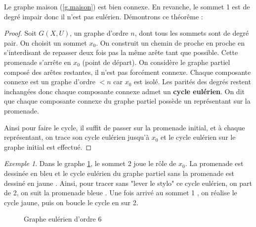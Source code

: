 \documentclass[12pt,a4paper]{scrartcl}
\newcommand{\G}{Soit $G(X,U)$, un graphe d'ordre $n$} %
\newcommand{\coul}[2]{\color{#1} #2 \color{black}} %
\theoremstyle{plain}
\theoremstyle{remark}
\newtheorem*{exemple}{Exemple}
\begin{document}
Le graphe maison (\ref{g.maison}) est bien connexe. En revanche, le sommet 1 est de degré impair donc il n'est pas eulérien. 
Démontrons ce théorême :
\begin{proof}
	\G, dont tous les sommets sont de degré pair. On choisit un sommet $x_0$. On construit un chemin de proche en proche en s'interdisant de repasser deux fois pas la même arête tant que possible. Cette promenade s'arrête en $x_0$ (point de départ).
	On considère le graphe partiel composé des arêtes restantes, il n'est pas forcément connexe. Chaque composante connexe est un graphe d'ordre $< n$ car $x_0$ est isolé. Les parités des degrés restent inchangées donc chaque composante connexe admet un \textbf{cycle eulérien}. On dit que chaque composante connexe du graphe partiel possède un représentant sur la promenade.
	
Ainsi pour faire le cycle, il suffit de passer sur la promenade initial, et à chaque représentant, on trace son cycle eulérien jusqu'à $x_0$ et le cycle eulérien sur le graphe initial est effectué.
\end{proof}

\begin{exemple}
Dans le graphe \ref{g.eulerien}, le sommet \coul{red}{2} joue le rôle de $x_0$.
La promenade est dessinée en \coul{blue}{bleu} et le cycle eulérien du graphe partiel sans la promenade est dessiné en \coul{yellow}{jaune}.
 Ainsi, pour tracer sans "lever le stylo" ce cycle eulérien, on part de 2, on suit la promenade \coul{blue}{bleue}. Une fois arrivé au sommet \coul{purple}{1}
, on réalise le cycle jaune, puis on boucle le cycle en sur 2.
\end{exemple}

	\begin{figure}
	\centering
	\caption{Graphe eulérien d'ordre 6}\label{g.eulerien}
	\end{figure}
\end{document}
